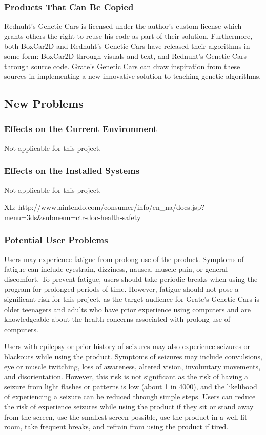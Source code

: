 \documentclass[12pt, titlepage]{article}
\begin{document}
\subsubsection{Products That Can Be Copied}
Rednuht's Genetic Cars is licensed under the author's custom license which 
grants others the right to reuse his code as part of their solution. 
Furthermore, both BoxCar2D and Rednuht's Genetic Cars have released their 
algorithms in some form: BoxCar2D through visuals and text, and Rednuht's 
Genetic Cars through source code. Grate's Genetic Cars can draw inspiration from 
these sources in implementing a new innovative solution to teaching genetic 
algorithms.

\subsection{New Problems}

\subsubsection{Effects on the Current Environment}
Not applicable for this project.

\subsubsection{Effects on the Installed Systems}
Not applicable for this project.

XL: 
http://www.nintendo.com/consumer/info/en_na/docs.jsp?menu=3ds&submenu=ctr-doc-health-safety
\subsubsection{Potential User Problems}
Users may experience fatigue from prolong use of the product. Symptoms of 
fatigue can include eyestrain, dizziness, nausea, muscle pain, or general 
discomfort. To prevent fatigue, users should take periodic breaks when using the 
program for prolonged periods of time. However, fatigue should not pose a 
significant risk for this project, as the target audience for Grate's Genetic 
Cars is older teenagers and adults who have prior experience using computers and 
are  knowledgeable about the health concerns associated with prolong use of 
computers.

Users with epilepsy or prior history of seizures may also experience seizures or 
blackouts while using the product. Symptoms of seizures may include convulsions, 
eye or muscle twitching, loss of awareness, altered vision, involuntary 
movements, and disorientation. However, this risk is not significant as the risk 
of having a seizure from light flashes or patterns is low (about 1 in 4000), and 
the likelihood of experiencing a seizure can be reduced through simple steps. 
Users can reduce the risk of experience seizures while using the product if they 
sit or stand away from the screen, use the smallest screen possible, use the 
product in a well lit room, take frequent breaks, and refrain from using the 
product if tired.
\end{document}
